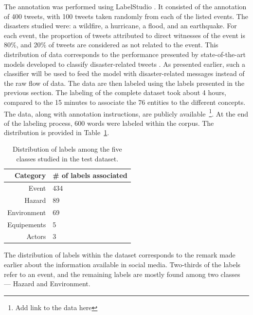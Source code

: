 The annotation was performed using LabelStudio \parencite{tkachenkoLabelStudioData2020}.
It consisted of the annotation of 400 tweets, with 100 tweets taken randomly from each of the listed events.
The disasters studied were: a wildfire, a hurricane, a flood, and an earthquake.
For each event, the proportion of tweets attributed to direct witnesses of the event is 80\%, and 20\% of tweets are considered as not related to the event.
This distribution of data corresponds to the performance presented by state-of-the-art models developed to classify disaster-related tweets \parencite{xukunImprovingDisasterrelatedTweet2020}.
As presented earlier, such a classifier will be used to feed the model with disaster-related messages instead of the raw flow of data.
The data are then labeled using the labels presented in the previous section.
The labeling of the complete dataset took about 4 hours, compared to the 15 minutes to associate the 76 entities to the different concepts.
The data, along with annotation instructions, are publicly available~\footnote{Add link to the data here}.
At the end of the labeling process, 600 words were labeled within the corpus.
The distribution is provided in Table~\ref{table:labels-distribution}.

\begin{table}[bp]
    \centering
    \caption{Distribution of labels among the five classes studied in the test dataset.}
    \begin{tabular}{rl}
        Category    & \# of labels associated \\
        \toprule
        Event       & 434                     \\
        Hazard      & 89                      \\
        Environment & 69                      \\
        Equipements & 5                       \\
        Actors      & 3                       \\
        \bottomrule
    \end{tabular}
    \label{table:labels-distribution}
\end{table}

The distribution of labels within the dataset corresponds to the remark made earlier about
the information available in social media.
Two-thirds of the labels refer to an event, and the remaining labels are mostly found among
two classes — Hazard and Environment.

